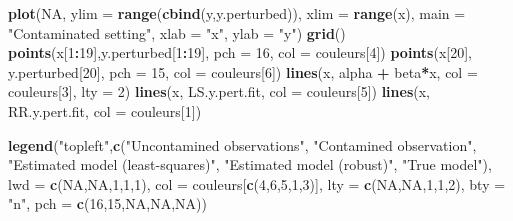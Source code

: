 \documentclass[]{book}
\newenvironment{Shaded}{\begin{snugshade}}{\end{snugshade}}
\newcommand{\DataTypeTok}[1]{\textcolor[rgb]{0.13,0.29,0.53}{#1}}
\newcommand{\DecValTok}[1]{\textcolor[rgb]{0.00,0.00,0.81}{#1}}
\newcommand{\KeywordTok}[1]{\textcolor[rgb]{0.13,0.29,0.53}{\textbf{#1}}}
\newcommand{\NormalTok}[1]{#1}
\newcommand{\OperatorTok}[1]{\textcolor[rgb]{0.81,0.36,0.00}{\textbf{#1}}}
\newcommand{\OtherTok}[1]{\textcolor[rgb]{0.56,0.35,0.01}{#1}}
\newcommand{\StringTok}[1]{\textcolor[rgb]{0.31,0.60,0.02}{#1}}
\theoremstyle{definition}
\theoremstyle{definition}
\theoremstyle{definition}
\theoremstyle{remark}
\begin{document}
\begin{Shaded}
\begin{Highlighting}[]
\KeywordTok{plot}\NormalTok{(}\OtherTok{NA}\NormalTok{, }\DataTypeTok{ylim =} \KeywordTok{range}\NormalTok{(}\KeywordTok{cbind}\NormalTok{(y,y.perturbed)), }\DataTypeTok{xlim =} \KeywordTok{range}\NormalTok{(x),}
     \DataTypeTok{main =} \StringTok{"Contaminated setting"}\NormalTok{, }\DataTypeTok{xlab =} \StringTok{"x"}\NormalTok{, }\DataTypeTok{ylab =} \StringTok{"y"}\NormalTok{)}
\KeywordTok{grid}\NormalTok{()}
\KeywordTok{points}\NormalTok{(x[}\DecValTok{1}\OperatorTok{:}\DecValTok{19}\NormalTok{],y.perturbed[}\DecValTok{1}\OperatorTok{:}\DecValTok{19}\NormalTok{], }\DataTypeTok{pch =} \DecValTok{16}\NormalTok{, }\DataTypeTok{col =}\NormalTok{ couleurs[}\DecValTok{4}\NormalTok{])}
\KeywordTok{points}\NormalTok{(x[}\DecValTok{20}\NormalTok{], y.perturbed[}\DecValTok{20}\NormalTok{], }\DataTypeTok{pch =} \DecValTok{15}\NormalTok{, }\DataTypeTok{col =}\NormalTok{ couleurs[}\DecValTok{6}\NormalTok{])}
\KeywordTok{lines}\NormalTok{(x, alpha }\OperatorTok{+}\StringTok{ }\NormalTok{beta}\OperatorTok{*}\NormalTok{x, }\DataTypeTok{col =}\NormalTok{ couleurs[}\DecValTok{3}\NormalTok{], }\DataTypeTok{lty =} \DecValTok{2}\NormalTok{)}
\KeywordTok{lines}\NormalTok{(x, LS.y.pert.fit, }\DataTypeTok{col =}\NormalTok{ couleurs[}\DecValTok{5}\NormalTok{])}
\KeywordTok{lines}\NormalTok{(x, RR.y.pert.fit, }\DataTypeTok{col =}\NormalTok{ couleurs[}\DecValTok{1}\NormalTok{])}

\KeywordTok{legend}\NormalTok{(}\StringTok{"topleft"}\NormalTok{,}\KeywordTok{c}\NormalTok{(}\StringTok{"Uncontamined observations"}\NormalTok{, }\StringTok{"Contamined observation"}\NormalTok{,}
                   \StringTok{"Estimated model (least-squares)"}\NormalTok{, }\StringTok{"Estimated model (robust)"}\NormalTok{,}
                   \StringTok{"True model"}\NormalTok{), }\DataTypeTok{lwd =} \KeywordTok{c}\NormalTok{(}\OtherTok{NA}\NormalTok{,}\OtherTok{NA}\NormalTok{,}\DecValTok{1}\NormalTok{,}\DecValTok{1}\NormalTok{,}\DecValTok{1}\NormalTok{), }\DataTypeTok{col =}\NormalTok{ couleurs[}\KeywordTok{c}\NormalTok{(}\DecValTok{4}\NormalTok{,}\DecValTok{6}\NormalTok{,}\DecValTok{5}\NormalTok{,}\DecValTok{1}\NormalTok{,}\DecValTok{3}\NormalTok{)],}
       \DataTypeTok{lty =} \KeywordTok{c}\NormalTok{(}\OtherTok{NA}\NormalTok{,}\OtherTok{NA}\NormalTok{,}\DecValTok{1}\NormalTok{,}\DecValTok{1}\NormalTok{,}\DecValTok{2}\NormalTok{), }\DataTypeTok{bty =} \StringTok{"n"}\NormalTok{, }\DataTypeTok{pch =} \KeywordTok{c}\NormalTok{(}\DecValTok{16}\NormalTok{,}\DecValTok{15}\NormalTok{,}\OtherTok{NA}\NormalTok{,}\OtherTok{NA}\NormalTok{,}\OtherTok{NA}\NormalTok{))}
\end{Highlighting}
\end{Shaded}
\end{document}
